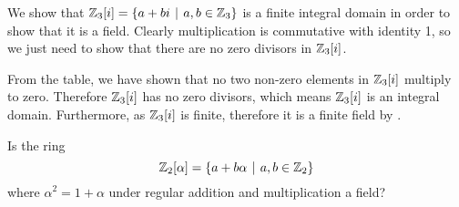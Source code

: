\begin{example}
    We show that $\Z_3[i] = \{a+bi \vert a,b \in \Z_3\}$ is a finite integral domain in order to show that it is a field. Clearly multiplication is commutative with identity 1, so we just need to show that there are no zero divisors in $\mathbb{Z}_3[i]$.
    \begin{table}[h]
        \centering
    \end{table}

    From the table, we have shown that no two non-zero elements in $\mathbb{Z}_3[i]$ multiply to zero. Therefore $\mathbb{Z}_3[i]$ has no zero divisors, which means $\mathbb{Z}_3[i]$ is an integral domain. Furthermore, as $\mathbb{Z}_3[i]$ is finite, therefore it is a finite field by .
\end{example}

\begin{exercise}\label{exercise-Zn2[alpha]}
    Is the ring
    \[
        \Z_2[\alpha] = \{a+b\alpha \vert a,b\in\Z_2\}
    \]
    where $\alpha^2 = 1 + \alpha$ under regular addition and multiplication a field?
\end{exercise}


